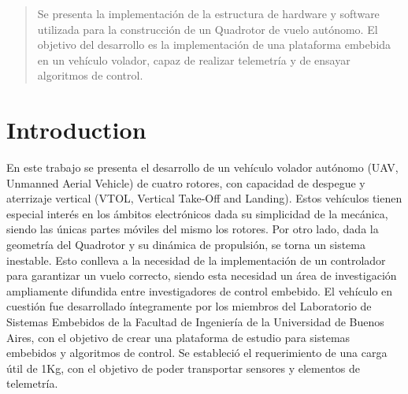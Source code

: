 \documentclass[conference]{IEEEtran}
\begin{document}
\begin{abstract}
Se presenta la implementación de la estructura de hardware y software utilizada para la construcción de un Quadrotor de vuelo autónomo. El objetivo del desarrollo es la implementación de una plataforma embebida en un vehículo volador, capaz de realizar telemetría y de ensayar algoritmos de control.
\end{abstract}





%
\IEEEpeerreviewmaketitle



\section{Introduction}
En este trabajo se presenta el desarrollo de un vehículo volador autónomo (UAV, Unmanned Aerial Vehicle) de cuatro rotores, con capacidad de despegue y aterrizaje vertical (VTOL, Vertical Take-Off and Landing). Estos vehículos tienen especial interés en los ámbitos electrónicos dada su simplicidad de la mecánica, siendo las únicas partes móviles del mismo los rotores. Por otro lado, dada la geometría del Quadrotor y su dinámica de propulsión, se torna un sistema inestable. Esto conlleva a la necesidad de la implementación de un controlador para garantizar un vuelo correcto, siendo esta necesidad un área de investigación ampliamente difundida entre investigadores de control embebido. El vehículo en cuestión fue desarrollado íntegramente por los miembros del Laboratorio de Sistemas Embebidos de la Facultad de Ingeniería de la Universidad de Buenos Aires, con el objetivo de crear una plataforma de estudio para sistemas embebidos y algoritmos de control. Se estableció el requerimiento de una carga útil de 1Kg, con el objetivo de poder transportar sensores y elementos de telemetría.
\end{document}
